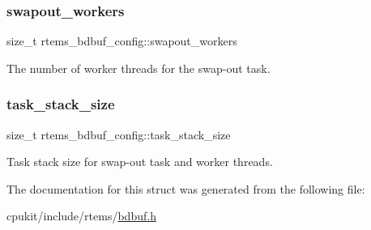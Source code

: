 \subsubsection{\texorpdfstring{swapout\_workers}{swapout\_workers}}
{\footnotesize\ttfamily size\+\_\+t rtems\+\_\+bdbuf\+\_\+config\+::swapout\+\_\+workers}

The number of worker threads for the swap-\/out task. \mbox{\label{structrtems__bdbuf__config_a5716931c17530600fe73943eecd6f3f4}} 
\subsubsection{\texorpdfstring{task\_stack\_size}{task\_stack\_size}}
{\footnotesize\ttfamily size\+\_\+t rtems\+\_\+bdbuf\+\_\+config\+::task\+\_\+stack\+\_\+size}

Task stack size for swap-\/out task and worker threads. 

The documentation for this struct was generated from the following file\+:\begin{DoxyCompactItemize}
\item 
cpukit/include/rtems/\mbox{\hyperlink{bdbuf_8h}{bdbuf.\+h}}\end{DoxyCompactItemize}
